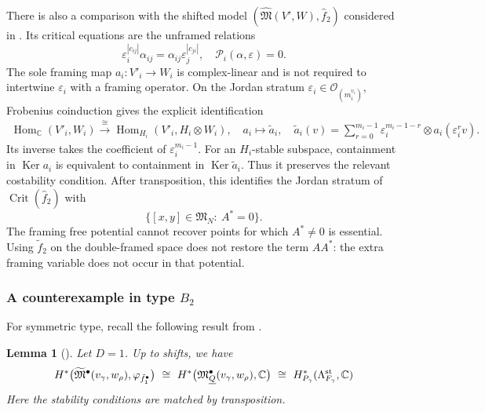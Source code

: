 \documentclass[11pt,reqno]{amsart}
\newtheorem{Lemma}[Theorem]{Lemma}
\theoremstyle{definition}
\theoremstyle{remark}
\def\bbC{\mathbb C}
\def\dQ{\underline Q}
\def\Ker{\operatorname{Ker}}
\def\Hom{\operatorname{Hom}}
\def\M{\mathfrak M}
\begin{document}
There is also a comparison with the shifted
model $(\widehat{\mathfrak M}(V',W),\hat f_2)$ considered in
\cite[\S4.3, Prop.~5.8]{VV23}. Its critical equations are the
unframed relations
\[
 \varepsilon_i^{|c_{ij}|}\alpha_{ij}
       =\alpha_{ij}\varepsilon_j^{|c_{ji}|},\quad
 \mathcal P_i(\alpha,\varepsilon)=0.
\]
The sole framing map $a_i:V'_i\to W_i$ is complex-linear and is not
required to intertwine $\varepsilon_i$ with a framing operator.
On the Jordan stratum $\varepsilon_i\in\mathcal O_{(m_i^{v_i})}$,
Frobenius coinduction gives the explicit identification
\begin{align*}
 \Hom_{\bbC}(V'_i,W_i)\xrightarrow{\cong}
             \Hom_{H_i}(V'_i,H_i\otimes W_i),\quad
 a_i\longmapsto\widetilde a_i,
 \quad\widetilde a_i(v)=
  \sum_{r=0}^{m_i-1}\varepsilon_i^{m_i-1-r}\otimes
                           a_i(\varepsilon_i^r v).
\end{align*}
Its inverse takes the coefficient of $\varepsilon_i^{m_i-1}$.
For an $H_i$-stable subspace, containment in $\Ker a_i$ is equivalent
to containment in $\Ker\widetilde a_i$. Thus it preserves the relevant
costability condition. After transposition, this identifies the
Jordan stratum of $\operatorname{Crit}(\hat f_2)$ with
\begin{equation}\label{eq:VV23-simple-Jordan}
 \{[x,y]\in\mathfrak M_N:\ A^*=0\}.
\end{equation}
The framing free potential cannot recover points for which $A^*\neq0$
is essential. Using $\tilde f_2$ on the double-framed space does not
restore the term $AA^*$: the extra framing variable does not occur
in that potential.
\fi%

\subsubsection{A counterexample in type $B_2$}
For symmetric type, recall the following result from \cite{VV23}.
\begin{Lemma}[\cite{VV23}]\label{lem:VV23-sym}
Let $D=1$. 
Up to shifts, we have
\[
H^*\big(\widetilde{\mathfrak M}^\bullet(v_\gamma,w_\rho),\varphi_{\tilde f^\bullet_1}\big)\ \cong\ H^*\big(\M_{\dQ}^\bullet(v_\gamma,w_\rho),\bbC\big)\ \cong\ H^*_{P_\gamma}(\Lambda^{\rm st}_{F_\gamma},\bbC)%
\]
Here the stability conditions are matched by transposition.
\end{Lemma}
\end{document}
